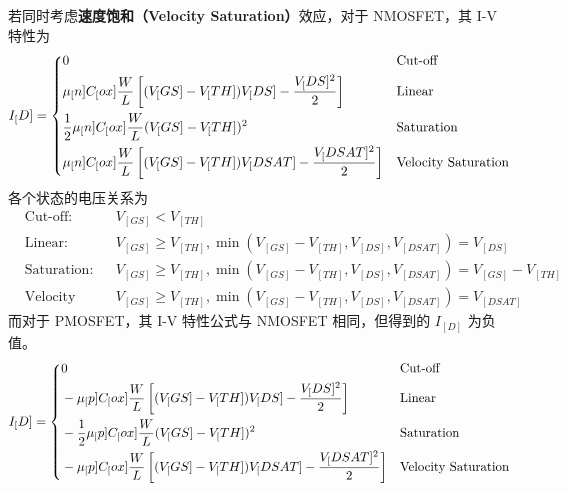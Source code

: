 若同时考虑\textbf{速度饱和（Velocity Saturation）}效应，对于 NMOSFET，其 I-V 特性为
\begin{equation}
    I_[D] = 
    \begin{dcases}  %
        \begin{aligned}
            & 0 && \text{Cut-off} \\
            & \mu_[n] C_[ox] \frac{W}{L} \left[ (V_[GS] - V_[TH]) V_[DS] - \frac{V_[DS]^2}{2} \right] && \text{Linear} \\
            & \frac{1}{2} \mu_[n] C_[ox] \frac{W}{L} (V_[GS] - V_[TH])^2 && \text{Saturation} \\
            & \mu_[n] C_[ox] \frac{W}{L} \left[ (V_[GS] - V_[TH]) V_[DSAT] - \frac{V_[DSAT]^2}{2} \right] && \text{Velocity Saturation}
        \end{aligned}
    \end{dcases}
\end{equation}
各个状态的电压关系为
\begin{equation}
    \begin{aligned}
        & \text{Cut-off:} && V_[GS] < V_[TH] \\
        & \text{Linear:} && V_[GS] \geqslant V_[TH], \min \left(V_[GS] - V_[TH], V_[DS], V_[DSAT]\right) = V_[DS] \\
        & \text{Saturation:} && V_[GS] \geqslant V_[TH], \min \left(V_[GS] - V_[TH], V_[DS], V_[DSAT]\right) = V_[GS] - V_[TH] \\
        & \text{Velocity Saturation:} && V_[GS] \geqslant V_[TH], \min \left(V_[GS] - V_[TH], V_[DS], V_[DSAT]\right) = V_[DSAT]
    \end{aligned}
\end{equation}
而对于 PMOSFET，其 I-V 特性公式与 NMOSFET 相同，但得到的 $I_[D]$ 为负值。
\begin{equation}
    I_[D] = 
    \begin{dcases}  %
        \begin{aligned}
            & 0 && \text{Cut-off} \\
            & -\mu_[p] C_[ox] \frac{W}{L} \left[ (V_[GS] - V_[TH]) V_[DS] - \frac{V_[DS]^2}{2} \right] && \text{Linear} \\
            & -\frac{1}{2} \mu_[p] C_[ox] \frac{W}{L} (V_[GS] - V_[TH])^2 && \text{Saturation} \\
            & -\mu_[p] C_[ox] \frac{W}{L} \left[ (V_[GS] - V_[TH]) V_[DSAT] - \frac{V_[DSAT]^2}{2} \right] && \text{Velocity Saturation}
        \end{aligned}
    \end{dcases}
\end{equation}
